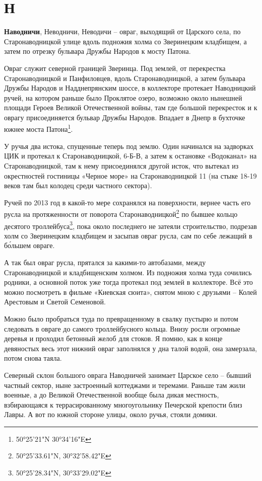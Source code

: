 \chapter*{Н}

\textbf{Наводничи}, Неводничи, Неводичи – овраг, выходящий от Царского села, по Старонаводницкой улице вдоль подножия холма со Зверинецким кладбищем, а затем по отрезку бульвара Дружбы Народов к мосту Патона. 

Овраг служит северной границей Зверинца. Под землей, от перекрестка Старонаводницкой и Панфиловцев, вдоль Старонаводницкой, а затем бульвара Дружбы Народов и Надднепрянским шоссе, в коллекторе протекает Наводницкий ручей, на котором раньше было Проклятое озеро, возможно около нынешней площади Героев Великой Отечественной войны, там где большой перекресток и к оврагу присоединяется бульвар Дружбы Народов. Впадает в Днепр в бухточке южнее моста Патона\footnote{50°25'21"N 30°34'16"E}.

У ручья два истока, спущенные теперь под землю. Один начинался на задворках ЦИК и протекал к Старонаводницкой, 6-Б-В, а затем к остановке «Водоканал» на Старонаводницкой, там к нему присоединялся другой исток, что вытекал из окрестностей гостиницы «Черное море» на Старонаводницкой 11 (на стыке 18-19 веков там был колодец среди частного сектора).

Ручей по 2013 год в какой-то мере сохранялся на поверхности, вернее часть его русла на протяженности от поворота Старонаводницкой\footnote{50°25'33.61"N, 30°32'58.42"E} по бывшее кольцо десятого троллейбуса\footnote{ 50°25'28.34"N, 30°33'29.02"E}, пока около последнего не затеяли строительство, подрезав холм со Зверинецким кладбищем и засыпав овраг русла, сам по себе лежащий в б\'ольшем овраге. 

А так был овраг русла, прятался за какими-то автобазами, между Старонаводницкой и кладбищенским холмом. Из подножия холма туда сочились родники, а основной поток уже тогда протекал под землей в коллекторе. Всё это можно посмотреть в фильме «Киевская сюита», снятом мною с друзьями – Колей Арестовым и Светой Семеновой.

Можно было пробраться туда по превращенному в свалку пустырю и потом следовать в овраге до самого троллейбусного кольца. Внизу росли огромные деревья и проходил бетонный желоб для стоков. Я помню, как в конце девяностых весь этот нижний овраг заполнялся у дна талой водой, она замерзала, потом снова таяла.

Северный склон большого оврага Наводничей занимает Царское село – бывший частный сектор, ныне застроенный коттеджами и теремами. Раньше там жили военные, а до Великой Отечественной вообще была дикая местность, взбирающаяся к террасированному многоугольнику Печерской крепости близ Лавры. А вот по южной стороне улицы, около ручья, стояли домики.


